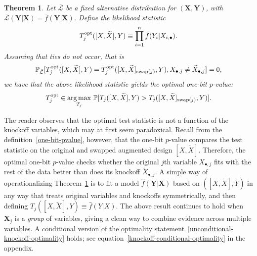 \documentclass[12pt]{article}
\newtheorem{theorem}{Theorem}
\theoremstyle{definition}
\theoremstyle{remark}
\newcommand{\prx}{\bm X}
\newcommand{\srx}{X}
\newcommand{\srxk}{\widetilde X}
\newcommand{\pry}{{\bm Y}}
\newcommand{\sry}{Y}
\begin{document}
\begin{theorem} \label{prop:knockoff-optimality}
	Let $\bar{\mathcal L}$ be a fixed alternative distribution for $(\prx,\pry)$, with $\bar{\mathcal L}(\pry|\prx) = \bar f(\pry|\prx)$. Define the likelihood statistic
	\begin{equation}
	T_j^{\textnormal{opt}}([\srx, \srxk], \sry) \equiv \prod_{i = 1}^n\bar f(\sry_i|\srx_{i,\bullet}).
	\label{log-likelihood-ratio-knockoffs}
	\end{equation}
	Assuming that ties do not occur, that is
	\begin{equation}
	\mathbb P_{\bar {\mathcal L}}[T^{\textnormal{opt}}_j([\srx, \srxk], \sry) = T^{\textnormal{opt}}_j([\srx, \srxk]_{\textnormal{swap}(j)}, \sry), \srx_{\bullet, j} \neq \srxk_{\bullet, j}] = 0, 
	\label{nondegeneracy-assumption}
	\end{equation}
	we have that the above likelihood statistic yields the optimal one-bit $p$-value:
	\begin{equation}
	T_j^{\textnormal{opt}} \in \underset{T_j}{\arg \max}\ \mathbb P[T_j([\srx, \srxk], \sry) > T_j([\srx, \srxk]_{\textnormal{swap}(j)}, \sry)].
	\label{unconditional-knockoff-optimality}
	\end{equation}
\end{theorem}

The reader observes that the optimal test statistic is not a function of the knockoff variables, which may at first seem paradoxical. Recall from the definition~\eqref{one-bit-pvalue}, however, that the one-bit $p$-value compares the test statistic on the original and swapped augmented design $[\srx, \srxk]$. Therefore, the optimal one-bit $p$-value checks whether the original $j$th variable $\srx_{\bullet, j}$ fits with the rest of the data better than does its knockoff $\srxk_{\bullet, j}$. A simple way of operationalizing Theorem~\ref{prop:knockoff-optimality} is to fit a model $\widehat f(\pry|\prx)$ based on $([\srx, \srxk], \sry)$ in any way that treats original variables and knockoffs symmetrically, and then defining $T_j([\srx, \srxk], \sry) \equiv \widehat f(\sry|\srx)$. The above result continues to hold when $\prx_j$ is a \textit{group} of variables, giving a clean way to combine evidence across multiple variables. A conditional version of the optimality statement~\eqref{unconditional-knockoff-optimality} holds; see equation~\eqref{knockoff-conditional-optimality} in the appendix.
\end{document}
